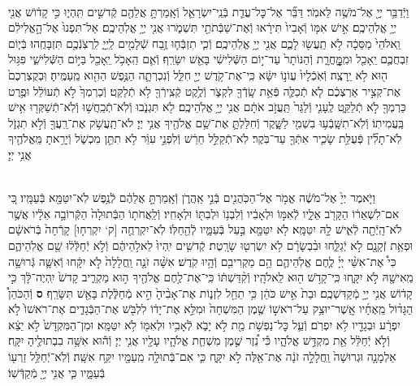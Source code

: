 \documentclass[twoside, openany, parskip=half, 11pt]{book}
\begin{document}
\begin{footnotesize}
\begin{multicols}{2}
\\
וַיְֿדַבֵּ֥ר יְיָ֖ אֶל־מֹשֶׁ֥ה לֵּאמֹֽר׃ דַּבֵּ֞ר אֶל־כׇּל־עֲדַ֧ת בְּֿנֵֽי־יִשְׂרָאֵ֛ל וְֿאָֽמַרְתָּ֥ אֲלֵהֶ֖ם קְֿדשִׁ֣ים תִּֽהְי֑וּ כִּ֣י קָד֔וֹשׁ אֲנִ֖י יְיָ֥ אֱלֹֽהֵיכֶֽם׃ אִ֣ישׁ אִמּ֤וֹ וְֿאָבִיו֙ תִּירָ֔אוּ וְֿאֶת־שַׁבְּֿתֹתַ֖י תִּשְׁמֹ֑רוּ אֲנִ֖י יְיָ֥ אֱלֹֽהֵיכֶֽם׃ אַל־תִּפְנוּ֙ אֶל־הָ֣אֱלִילִ֔ם וֵֽאלֹהֵי֙ מַסֵּכָ֔ה לֹ֥א תַֽעֲשׂ֖וּ לָכֶ֑ם אֲנִ֖י יְיָ֥ אֱלֹֽהֵיכֶֽם׃  וְֿכִ֧י תִזְבְּֿח֛וּ זֶ֥בַח שְֿׁלָמִ֖ים לַֽיְיָ֑ לִֽרְצֹֽנְֿכֶ֖ם תִּזְבָּחֻֽהוּ׃ בְּֿי֧וֹם זִבְחֲכֶ֛ם יֵֽאָכֵ֖ל וּמִֽמׇׇׇׇׇׇָּֽחֳרָ֑ת וְֿהַנּוֹתָר֙ עַד־י֣וֹם הַשְּֿׁלִישִׁ֔י בָּאֵ֖שׁ יִשָּׂרֵֽף׃ וְֿאִ֛ם הֵֽאָכֹ֥ל יֵֽאָכֵ֖ל בַּיּ֣וֹם הַשְּֿׁלִישִׁ֑י פִּגּ֥וּל ה֖וּא לֹ֥א יֵֽרָצֶֽה׃ וְֿאֹֽכְֿלָיו֙ עֲוֹנ֣וֹ יִשָּׂ֔א כִּֽי־אֶת־קֹ֥דֶשׁ יְיָ֖ חִלֵּ֑ל וְֿנִכְרְתָ֛ה הַנֶּ֥פֶשׁ הַהִ֖וא מֵֽעַמֶּֽיהָ׃ וּֽבְקֻצְרְכֶם֙ אֶת־קְצִ֣יר אַרְצְכֶ֔ם לֹ֧א תְֿכַלֶּ֛ה פְּֿאַ֥ת שָֽׂדְֿךָ֖ לִקְצֹ֑ר וְֿלֶ֥קֶט קְֿצִֽירְֿךָ֖ לֹ֥א תְֿלַקֵּֽט׃ וְֿכַרְמְךָ֙ לֹ֣א תְֿעוֹלֵ֔ל וּפֶ֥רֶט כַּרְמְךָ֖ לֹ֣א תְֿלַקֵּ֑ט לֶֽעָנִ֤י וְֿלַגֵּר֙ תַּֽעֲזֹ֣ב אֹתָ֔ם אֲנִ֖י יְיָ֥ אֱלֹֽהֵיכֶֽם׃  לֹ֖א תִּגְנֹ֑בוּ וְֿלֹֽא־תְֿכַֽחֲשׁ֥וּ וְֿלֹֽא־תְֿשַׁקְּר֖וּ אִ֥ישׁ בַּֽעֲמִיתֽוֹ׃ וְֿלֹֽא־תִשָּֽׁבְֿע֥וּ בִשְׁמִ֖י לַשָּׁ֑קֶר וְֿחִלַּלְתָּ֛ אֶת־שֵׁ֥ם אֱלֹהֶ֖יךָ אֲנִ֥י יְיָ׃ לֹא־תַֽעֲשֹׁ֥ק אֶת־רֵֽעֲךָ֖ וְֿלֹ֣א תִגְזֹ֑ל לֹֽא־תָלִ֞ין פְּֿעֻלַּ֥ת שָׂכִ֛יר אִתְּֿךָ֖ עַד־בֹּֽקֶר׃ לֹֽא־תְֿקַלֵּ֣ל חֵרֵ֔שׁ וְֿלִפְנֵ֣י עִוֵּ֔ר לֹ֥א תִתֵּ֖ן מִכְשֹׁ֑ל וְֿיָרֵ֥אתָ מֵּֽאֱלֹהֶ֖יךָ אֲנִ֥י יְיָ׃

\\
וַיֹּ֤אמֶר יְיָ֙ אֶל־מֹשֶׁ֔ה אֱמֹ֥ר אֶל־הַכֹּֽהֲנִ֖ים בְּֿנֵ֣י אַֽהֲרֹ֑ן וְֿאָֽמַרְתָּ֣ אֲלֵהֶ֔ם לְֿנֶ֥פֶשׁ לֹֽא־יִטַּמָּ֖א בְּֿעַמָּֽיו׃ כִּ֚י אִם־לִשְׁאֵר֔וֹ הַקָּרֹ֖ב אֵלָ֑יו לְֿאִמּ֣וֹ וּלְאָבִ֔יו וְֿלִבְנ֥וֹ וּלְבִתּ֖וֹ וּלְאָחִֽיו׃ וְֿלַֽאֲחֹת֤וֹ הַבְּֿתוּלָה֙ הַקְּֿרוֹבָ֣ה אֵלָ֔יו אֲשֶׁ֥ר לֹא־הָֽיְֿתָ֖ה לְֿאִ֑ישׁ לָ֖הּ יִטַּמָּֽא׃ לֹ֥א יִטַּמָּ֖א בַּ֣עַל בְּֿעַמָּ֑יו לְֿהֵ֖חַלּֽוֹ׃ לֹֽא־יִקְרְחֻ֤ה [ק‘ יִקְרְח֤וּ] קָרְֿחָה֙ בְּֿרֹאשָׁ֔ם וּפְאַ֥ת זְֿקָנָ֖ם לֹ֣א יְֿגַלֵּ֑חוּ וּבִ֨בְשָׂרָ֔ם לֹ֥א יִשְׂרְט֖וּ שָׂרָֽטֶת׃ קְֿדשִׁ֤ים יִֽהְיוּ֙ לֵאלֹ֣הֵיהֶ֔ם וְֿלֹ֣א יְֿחַלְּֿל֔וּ שֵׁ֖ם אֱלֹֽהֵיהֶ֑ם כִּי֩ אֶת־אִשֵּׁ֨י יְיָ֜ לֶ֧חֶם אֱלֹֽהֵיהֶ֛ם הֵ֥ם מַקְרִיבִ֖ם וְֿהָ֥יוּ קֹֽדֶשׁ׃  אִשָּׁ֨ה זֹנָ֤ה וַֽחֲלָלָה֙ לֹ֣א יִקָּ֔חוּ וְֿאִשָּׁ֛ה גְּֿרוּשָׁ֥ה מֵֽאִישָׁ֖הּ לֹ֣א יִקָּ֑חוּ כִּֽי־קָדֹ֥שׁ ה֖וּא לֵֽאלֹהָֽיו׃ וְֿקִ֨דַּשְׁתּ֔וֹ כִּֽי־אֶת־לֶ֥חֶם אֱלֹהֶ֖יךָ ה֣וּא מַקְרִ֑יב קָדשׁ֙ יִֽהְיֶה־לָּ֔ךְ כִּ֣י קָד֔וֹשׁ אֲנִ֥י יְיָ֖ מְֿקַדִּשְׁכֶֽם׃ וּבַת֙ אִ֣ישׁ כֹּהֵ֔ן כִּ֥י תֵחֵ֖ל לִזְנ֑וֹת אֶת־אָבִ֨יהָ֙ הִ֣יא מְֿחַלֶּ֔לֶת בָּאֵ֖שׁ תִּשָּׂרֵֽף׃ \textbf{ס} וְֿהַכֹּהֵן֩ הַגָּד֨וֹל מֵֽאֶחָ֜יו אֲֽשֶׁר־יוּצַ֥ק עַל־רֹאשׁ֣וֹ שֶׁ֤מֶן הַמִּשְׁחָה֙ וּמִלֵּ֣א אֶת־יָד֔וֹ לִלְבֹּ֖שׁ אֶת־הַבְּֿגָדִ֑ים אֶת־רֹאשׁוֹ֙ לֹ֣א יִפְרָ֔ע וּבְגָדָ֖יו לֹ֥א יִפְרֹֽם׃ וְֿעַ֛ל כׇּל־נַפְשֹׁ֥ת מֵ֖ת לֹ֣א יָבֹ֑א לְֿאָבִ֥יו וּלְאִמּ֖וֹ לֹ֥א יִטַּמָּֽא׃ וּמִן־הַמִּקְדָּשׁ֙ לֹ֣א יֵצֵ֔א וְֿלֹ֣א יְֿחַלֵּ֔ל אֵ֖ת מִקְדַּ֣שׁ אֱלֹהָ֑יו כִּ֡י נֵ֠זֶר שֶׁ֣מֶן מִשְׁחַ֧ת אֱלֹהָ֛יו עָלָ֖יו אֲנִ֥י יְיָ׃  וְֿה֕וּא אִשָּׁ֥ה בִבְתוּלֶ֖יהָ יִקָּֽח׃ אַלְמָנָ֤ה וּגְרוּשָׁה֙ וַֽחֲלָלָ֣ה זֹנָ֔ה אֶת־אֵ֖לֶּה לֹ֣א יִקָּ֑ח כִּ֛י אִם־בְּֿתוּלָ֥ה מֵֽעַמָּ֖יו יִקַּ֥ח אִשָּֽׁה׃ וְֿלֹֽא־יְֿחַלֵּ֥ל זַרְע֖וֹ בְּֿעַמָּ֑יו כִּ֛י אֲנִ֥י יְיָ֖ מְֿקַדְּֿשֽׁוֹ׃


\end{multicols}
\end{footnotesize}
\end{document}
